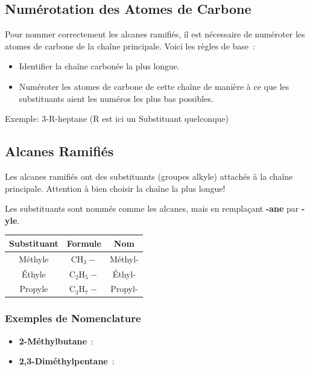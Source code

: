 \documentclass[12pt]{article}
\begin{document}
\subsection{Numérotation des Atomes de Carbone}
Pour nommer correctement les alcanes ramifiés, il est nécessaire de numéroter les atomes de carbone de la chaîne principale. Voici les règles de base~:
\begin{itemize}
    \item Identifier la chaîne carbonée la plus longue.
    \item Numéroter les atomes de carbone de cette chaîne de manière à ce que les substituants aient les numéros les plus bas possibles.
\end{itemize}

Exemple: 3-R-heptane (R est ici un Substituant quelconque)
\begin{center}
\end{center}

\subsection{Alcanes Ramifiés}
Les alcanes ramifiés ont des substituants (groupes alkyle) attachés à la chaîne principale. Attention à bien choisir la chaîne la plus longue!

Les substituants sont nommés comme les alcanes, mais en remplaçant \textbf{-ane} par \textbf{-yle}.

\begin{center}
\begin{tabular}{|c|c|c|}
\hline
Substituant & Formule & Nom \\ \hline
Méthyle & $\mathrm{CH_3-}$ & Méthyl- \\ \hline
Éthyle & $\mathrm{C_2H_5-}$ & Éthyl- \\ \hline
Propyle & $\mathrm{C_3H_7-}$ & Propyl- \\ \hline
\end{tabular}
\end{center}

\subsubsection{Exemples de Nomenclature}
\begin{itemize}
    \item \textbf{2-Méthylbutane}~:
    \begin{center}
    
    \end{center}

    \item \textbf{2,3-Diméthylpentane}~:
    \begin{center}
    \end{center}
\end{itemize}
\end{document}
